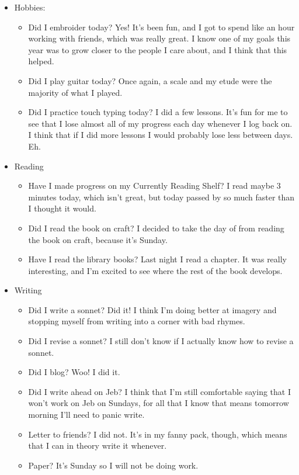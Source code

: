 \documentclass[12pt]{article}[titlepage]
\newcommand{\1}{\={a}}
\newcommand{\2}{\={e}}
\newcommand{\3}{\={\i}}
\newcommand{\4}{\=o}
\newcommand{\5}{\=u}
\newcommand{\6}{\={A}}
\renewcommand{\,}{\textsuperscript{,}}
\begin{document}
\begin{itemize}
\item Hobbies:
\begin{itemize}
\item Did I embroider today? Yes! It's been fun, and I got to spend like an hour working with friends, which was really great. I know one of my goals this year was to grow closer to the people I care about, and I think that this helped.
\item Did I play guitar today? Once again, a scale and my etude were the majority of what I played.
\item Did I practice touch typing today? I did a few lessons. It's fun for me to see that I lose almost all of my progress each day whenever I log back on. I think that if I did more lessons I would probably lose less between days. Eh.
\end{itemize}
\item Reading
\begin{itemize}
\item Have I made progress on my Currently Reading Shelf? I read maybe 3 minutes today, which isn't great, but today passed by so much faster than I thought it would.
\item Did I read the book on craft? I decided to take the day of from reading the book on craft, because it's Sunday.
\item Have I read the library books? Last night I read a chapter. It was really interesting, and I'm excited to see where the rest of the book develops.
\end{itemize}
\item Writing
\begin{itemize}
\item Did I write a sonnet? Did it! I think I'm doing better at imagery and stopping myself from writing into a corner with bad rhymes.
\item Did I revise a sonnet? I still don't know if I actually know how to revise a sonnet.
\item Did I blog? Woo! I did it.
\item Did I write ahead on Jeb? I think that I'm still comfortable saying that I won't work on Jeb on Sundays, for all that I know that means tomorrow morning I'll need to panic write.
\item Letter to friends? I did not. It's in my fanny pack, though, which means that I can in theory write it whenever.
\item Paper? It's Sunday so I will not be doing work.

\end{itemize}
\end{itemize}
\end{document}

